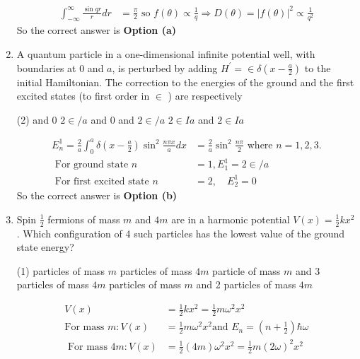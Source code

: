 \begin{enumerate}
\begin{answer}
\begin{align*}
	\int_{-\infty}^{\infty} \frac{\sin q r}{r} d r&=\frac{\pi}{2} \text { so } f(\theta) \propto \frac{1}{q} \Rightarrow D(\theta)=|f(\theta)|^{2} \propto \frac{1}{q^{2}}
	\end{align*}
		So the correct answer is \textbf{Option (a)}
\end{answer}
\item  A quantum particle in a one-dimensional infinite potential well, with boundaries at 0 and $a$, is perturbed by adding $H^{\prime}=\in \delta\left(x-\frac{a}{2}\right)$ to the initial Hamiltonian. The correction to the energies of the ground and the first excited states (to first order in $\in$ ) are respectively
 \begin{tasks}(2)
	 and 0
	\task[\textbf{b.}] $2 \in / a$ and 0
	 and $2 \in / a$
	\task[\textbf{d.}] $2 \in I a$ and $2 \in I a$ 
\end{tasks}
\begin{answer}
	\begin{align*}
	E_{n}^{1}=\frac{2}{a} \int_{0}^{a} \delta\left(x-\frac{a}{2}\right) \sin ^{2} \frac{n \pi x}{a} d x&=\frac{2}{a} \sin ^{2} \frac{n \pi}{2} \text { where } n=1,2,3 .\\
\text{	For ground state }n&=1, E_{1}^{1}=2 \in / a\\
\text{	For first excited state }n&=2, \quad E_{2}^{1}=0
	\end{align*}
		So the correct answer is \textbf{Option (b)}
\end{answer}
\item Spin $\frac{1}{2}$ fermions of mass $m$ and $4 m$ are in a harmonic potential $V(x)=\frac{1}{2} k x^{2}$. Which configuration of 4 such particles has the lowest value of the ground state energy?
 \begin{tasks}(1)
	 particles of mass $m$
	 particles of mass $4 m$
	 particle of mass $m$ and 3 particles of mass $4 m$
	 particles of mass $m$ and 2 particles of mass $4 m$	
\end{tasks}	
\begin{answer}
	\begin{align*}
 V(x)&=\frac{1}{2} k x^{2}=\frac{1}{2} m \omega^{2} x^{2}\\
	\text{For mass }m: V(x)&=\frac{1}{2} m \omega^{2} x^{2} \text{and }E_{n}=\left(n+\frac{1}{2}\right) \hbar \omega\\
\text{	For mass }4 m: V(x)&=\frac{1}{2}(4 m) \omega^{2} x^{2}=\frac{1}{2} m(2 \omega)^{2} x^{2}\\

\end{align*}
\end{answer}
\end{enumerate}
